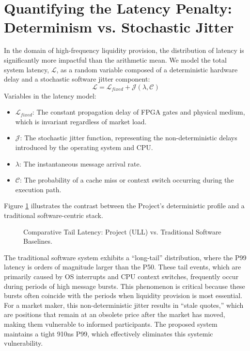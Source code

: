 \section{Quantifying the Latency Penalty: Determinism vs. Stochastic Jitter}
In the domain of high-frequency liquidity provision, the distribution of latency is significantly more impactful than the arithmetic mean. We model the total system latency, $\mathcal{L}$, as a random variable composed of a deterministic hardware delay and a stochastic software jitter component:
\begin{equation}
    \mathcal{L} = \mathcal{L}_{fixed} + \mathcal{J}(\lambda, \mathcal{C})
\end{equation}
Variables in the latency model:
\begin{itemize}
    \item $\mathcal{L}_{fixed}$: The constant propagation delay of FPGA gates and physical medium, which is invariant regardless of market load.
    \item $\mathcal{J}$: The stochastic jitter function, representing the non-deterministic delays introduced by the operating system and CPU.
    \item $\lambda$: The instantaneous message arrival rate.
    \item $\mathcal{C}$: The probability of a cache miss or context switch occurring during the execution path.
\end{itemize}

Figure \ref{fig:latency_comparison_bench_final} illustrates the contrast between the Project's deterministic profile and a traditional software-centric stack.

\begin{figure}
    \centering
    
    \caption{Comparative Tail Latency: Project (ULL) vs. Traditional Software Baselines.}
    \label{fig:latency_comparison_bench_final}
\end{figure}
\clearpage

The traditional software system exhibits a ``long-tail'' distribution, where the P99 latency is orders of magnitude larger than the P50. These tail events, which are primarily caused by OS interrupts and CPU context switches, frequently occur during periods of high message bursts. This phenomenon is critical because these bursts often coincide with the periods when liquidity provision is most essential. For a market maker, this non-deterministic jitter results in ``stale quotes,'' which are positions that remain at an obsolete price after the market has moved, making them vulnerable to informed participants. The proposed system maintains a tight 910ns P99, which effectively eliminates this systemic vulnerability.

